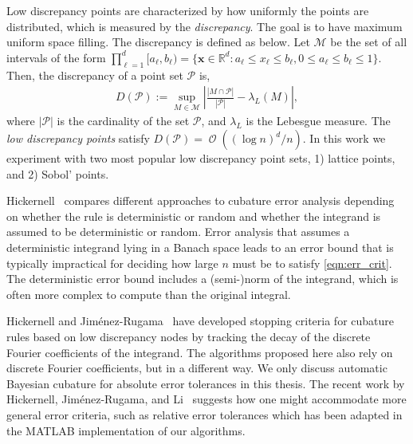 \documentclass{svjour3}                     %
\DeclareMathOperator{\Order}{{\mathcal O}}
\newcommand{\bm}[1]{\boldsymbol{#1}}
\newcommand{\vx}{\bm{x}}
\def\abs#1{\ensuremath{\left \lvert #1 \right \rvert}}
\begin{document}



Low discrepancy points are characterized by how uniformly the points are distributed, which is measured by the \emph{discrepancy}. %
The goal is to have maximum uniform space filling. The discrepancy is defined as below.
Let $\mathcal{M}$ be the set of all intervals of the form $\prod_{\ell=1}^{d} [a_\ell, b_\ell) = \{ \vx \in \mathbb{R}^d : a_\ell \le x_\ell \le b_\ell, 0 \le a_\ell \le b_\ell \le 1 \}$. Then, the discrepancy of a point set $\mathcal{P}$ is,
\begin{align*}
D(\mathcal{P}) := \sup_{M \in \mathcal{M}} 
\abs{ \frac{\abs{M \cap \mathcal{P}}}{\abs{\mathcal{P}}} - \lambda_L(M) },
\end{align*}
where $\abs{\mathcal{P}}$ is the cardinality of the set $\mathcal{P}$, and $\lambda_L$ is the Lebesgue measure.
The \emph{low discrepancy points} satisfy $D(\mathcal{P}) = \Order((\log n)^d/n)$.
In this work we experiment with two most popular low discrepancy point sets, 1) lattice points, and 2) Sobol' points.


Hickernell~\cite{Hic17a} compares different approaches to cubature error analysis depending on whether the rule is deterministic or random and whether the integrand is assumed to be deterministic or random.  Error analysis that assumes a deterministic integrand lying in a Banach space leads to an error bound that is typically impractical for deciding how large $n$ must be to satisfy \eqref{eqn:err_crit}.  The deterministic error bound includes a (semi-)norm of the integrand, which is often more complex to compute than the original integral.

Hickernell and Jim\'enez-Rugama~\cite{HicJim16a,JimHic16a} have developed stopping criteria for cubature rules based on low discrepancy nodes by tracking the decay of the discrete Fourier coefficients of the integrand.  The algorithms proposed here also rely on discrete Fourier coefficients, but in a different way.  We only discuss automatic Bayesian cubature for absolute error tolerances in this thesis. The recent work by Hickernell, Jim\'enez-Rugama, and Li~\cite{HicEtal17a} suggests how one might accommodate more general error criteria, such as relative error tolerances which has been adapted in the MATLAB implementation of our algorithms.
\end{document}
